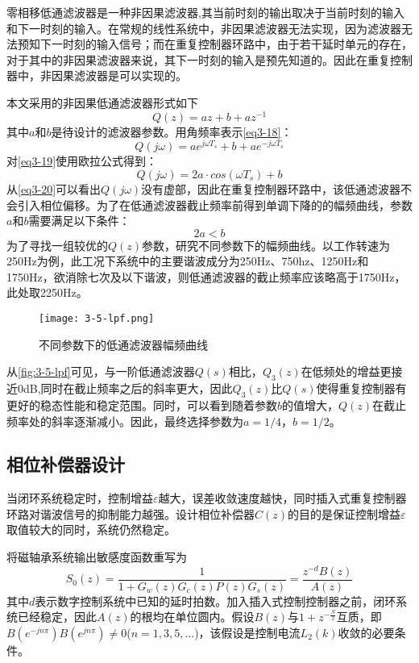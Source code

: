 \documentclass[
  lang=cn,
  degree=master,
  openany,oneside
]{nuaathesis}
\begin{document}
零相移低通滤波器是一种非因果滤波器,其当前时刻的输出取决于当前时刻的输入和下一时刻的输入。在常规的线性系统中，非因果滤波器无法实现，因为滤波器无法预知下一时刻的输入信号；而在重复控制器环路中，由于若干延时单元的存在，对于其中的非因果滤波器来说，其下一时刻的输入是预先知道的。因此在重复控制器中，非因果滤波器是可以实现的。

本文采用的非因果低通滤波器形式如下
\begin{equation}
\label{eq3-18}
Q(z)=az+b+az^{-1}
\end{equation}
其中$a$和$b$是待设计的滤波器参数。用角频率表示\autoref{eq3-18}：
\begin{equation}
\label{eq3-19}
Q(j\omega)=ae^{j\omega T_s}+b+ae^{-j\omega T_s}
\end{equation}
对\autoref{eq3-19}使用欧拉公式得到：
\begin{equation}
\label{eq3-20}
Q(j\omega)=2a\cdot cos(\omega T_s)+b
\end{equation}
从\autoref{eq3-20}可以看出$Q(j\omega)$没有虚部，因此在重复控制器环路中，该低通滤波器不会引入相位偏移。为了在低通滤波器截止频率前得到单调下降的的幅频曲线，参数$a$和$b$需要满足以下条件：
\begin{equation}
\label{eq3-21}
2a<b
\end{equation}
为了寻找一组较优的$Q(z)$参数，研究不同参数下的幅频曲线。以工作转速为250Hz为例，此工况下系统中的主要谐波成分为250Hz、750hz、1250Hz和1750Hz，欲消除七次及以下谐波，则低通滤波器的截止频率应该略高于1750Hz，此处取2250Hz。
\begin{figure}[h!]
	\texttt{[image: 3-5-lpf.png]}
	\caption{不同参数下的低通滤波器幅频曲线}
	\label{fig:3-5-lpf}
\end{figure}

从\autoref{fig:3-5-lpf}可见，与一阶低通滤波器$Q(s)$相比，$Q_3(z)$在低频处的增益更接近0dB,同时在截止频率之后的斜率更大，因此$Q_3(z)$比$Q(s)$使得重复控制器有更好的稳态性能和稳定范围。同时，可以看到随着参数$b$的值增大，$Q(z)$在截止频率处的斜率逐渐减小。因此，最终选择参数为$a=1/4$，$b=1/2$。
\subsection{相位补偿器设计}
当闭环系统稳定时，控制增益$\varepsilon$越大，误差收敛速度越快，同时插入式重复控制器环路对谐波信号的抑制能力越强。设计相位补偿器$C(z)$的目的是保证控制增益$\varepsilon$取值较大的同时，系统仍然稳定。

将磁轴承系统输出敏感度函数重写为
\begin{equation}
\label{eq_s0z}
S_0(z)=\frac{1}{1+G_w(z)G_c(z)P(z)G_s(z)}=\frac{z^{-d}B(z)}{A(z)}
\end{equation}
其中$d$表示数字控制系统中已知的延时拍数。加入插入式控制控制器之前，闭环系统已经稳定，因此$A(z)$的根均在单位圆内。假设$B(z)$与$1+z^{-\frac{N}{2}}$互质，即$B(e^{-jn\pi})B(e^{jn\pi})\neq 0$($n=1,3,5,...$)，该假设是控制电流$L_2(k)$收敛的必要条件。
\end{document}
